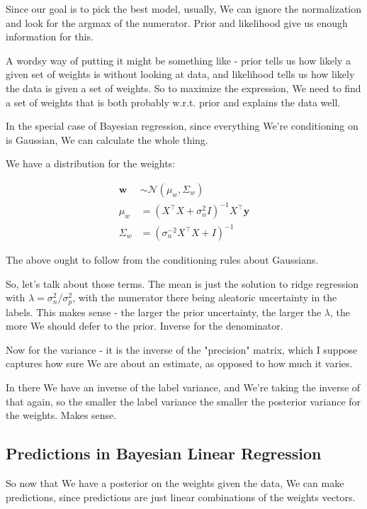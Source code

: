 \documentclass{article}
\begin{document}
		Since our goal is to pick the best model, usually, We can ignore the normalization and look for the argmax of the numerator. Prior and likelihood give us enough information for this.
		
		A wordsy way of putting it might be something like - prior tells us how likely a given set of weights is without looking at data, and likelihood tells us how likely the data is given a set of weights. So to maximize the expression, We need to find a set of weights that is both probably w.r.t. prior and explains the data well.
		
		In the special case of Bayesian regression, since everything We're conditioning on is Gaussian, We can calculate the whole thing.
		
		We have a distribution for the weights:
		
		\begin{align}
			\mathbf{w} &\sim \mathcal{N}(\mu_w, \Sigma_w)\\
			\mu_w &= (X^\top X + \sigma_n^2I)^{-1}X^\top \mathbf{y}\\
			\Sigma_w &= (\sigma_n^{-2}X^\top X + I)^{-1}			
		\end{align}
		
		The above ought to follow from the conditioning rules about Gaussians.
		
		So, let's talk about those terms. The mean is just the solution to ridge regression with $\lambda = \sigma^2_n/\sigma^2_p$, with the numerator there being aleatoric uncertainty in the labels. This makes sense - the larger the prior uncertainty, the larger the $\lambda$, the more We should defer to the prior. Inverse for the denominator.
		
		Now for the variance - it is the inverse of the "precision" matrix, which I suppose captures how sure We are about an estimate, as opposed to how much it varies. 
		
		In there We have an inverse of the label variance, and We're taking the inverse of that again, so the smaller the label variance the smaller the posterior variance for the weights. Makes sense.
		
	\subsection{Predictions in Bayesian Linear Regression}
	
		So now that We have a posterior on the weights given the data, We can make predictions, since predictions are just linear combinations of the weights vectors.
		
\end{document}
